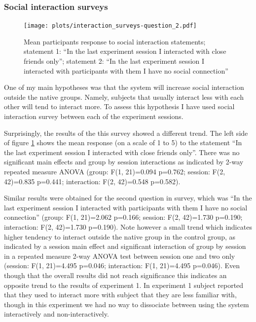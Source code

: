 \documentclass[a4paper,11pt]{article}
\begin{document}
{\subsubsection{Social interaction surveys}

\begin{figure}[!htb]
    \centering
    \texttt{[image: plots/interaction\_surveys-question\_2.pdf]}
    \caption{Mean participants response to social interaction statements; statement 1: ``In the last experiment session I interacted with close friends only''; statement 2: ``In the last experiment session I interacted with participants with them I have no social connection''}\label{plot:interaction_surveys-question_2}
\end{figure}

One of my main hypotheses was that the system will increase social interaction outside the native groups.
Namely, subjects that usually interact less with each other will tend to interact more.
To assess this hypothesis I have used social interaction survey between each of the experiment sessions.

Surprisingly, the results of the this survey showed a different trend.
The left side of figure \ref{plot:interaction_surveys-question_2} shows the mean response (on a scale of 1 to 5) to the statement ``In the last experiment session I interacted with close friends only''.
There was no significant main effects and group by session interactions as indicated by 2-way repeated measure ANOVA (group: F(1, 21)=0.094 p=0.762; session: F(2, 42)=0.835 p=0.441; interaction: F(2, 42)=0.548 p=0.582).

Similar results were obtained for the second question in survey, which was ``In the last experiment session I interacted with participants with them I have no social connection'' (group: F(1, 21)=2.062 p=0.166; session: F(2, 42)=1.730 p=0.190; interaction: F(2, 42)=1.730 p=0.190).
Note however a small trend which indicates higher tendency to interact outside the native group in the control group, as indicated by a session main effect and significant interaction of group by session in a repeated measure 2-way ANOVA test between session one and two only (session: F(1, 21)=4.495 p=0.046; interaction: F(1, 21)=4.495 p=0.046).
Even though that the overall results did not reach significance this indicates an opposite trend to the results of experiment 1.
In experiment 1 subject reported that they used to interact more with subject that they are less familiar with, though in this experiment we had no way to dissociate between using the system interactively and non-interactively.

}
\end{document}
